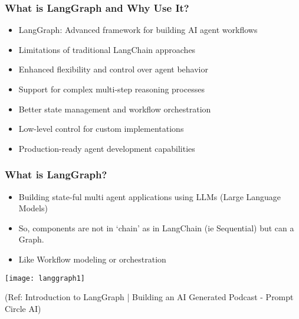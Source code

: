




\begin{frame}[fragile]\frametitle{What is LangGraph and Why Use It?}
      \begin{itemize}
        \item LangGraph: Advanced framework for building AI agent workflows
        \item Limitations of traditional LangChain approaches
        \item Enhanced flexibility and control over agent behavior
        \item Support for complex multi-step reasoning processes
        \item Better state management and workflow orchestration
        \item Low-level control for custom implementations
        \item Production-ready agent development capabilities
      \end{itemize}
\end{frame}

\begin{frame}\frametitle{What is LangGraph?}

\begin{itemize}
\item Building state-ful multi agent applications using LLMs (Large Language Models)
\item So, components are not in `chain' as in LangChain (ie Sequential) but can a Graph.
\item Like Workflow modeling or orchestration
\end{itemize}

\begin{center}
\texttt{[image: langgraph1]}
\end{center}	  


{\tiny (Ref: Introduction to LangGraph | Building an AI Generated Podcast - Prompt Circle AI)}
\end{frame}

